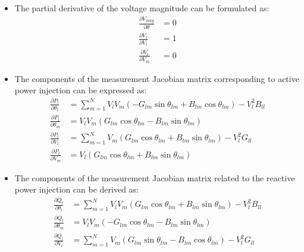 \begin{itemize}
    \item The partial derivative of the voltage magnitude can be formulated as:
        \begin{align} 
    	    \frac{\partial V_{mag}}{\partial \theta} &= 0
    	    \label{eq:V_mag_theta} \\[1pt]
    	    \frac{\partial V_{l}}{\partial V_{l}} &= 1
    	    \label{eq:V_mag_l} \\[1pt]
    	    \frac{\partial V_{l}}{\partial V_{m}} &= 0 
    	    \label{eq:V_mag_m} 
        \end{align}
    \item The components of the measurement Jacobian matrix corresponding to active power injection can be expressed as:
        \begin{align} 
    	    \frac{\partial P_{l}}{\partial \theta_l} &= \sum_{m=1}^{N}V_l V_m \left(-G_{lm}\sin{\theta_{lm}}+B_{lm}\cos{\theta_{lm}}\right)-V_l^2 B_{ll}
    	    \label{eq:P_inj_theta_l} \\[1pt]
    	    \frac{\partial P_{l}}{\partial \theta_m} &= V_l V_m \left(G_{lm}\cos{\theta_{lm}}-B_{lm}\sin{\theta_{lm}}\right)
    	    \label{eq:P_inj_theta_m} \\[1pt]
    	    \frac{\partial P_{l}}{\partial V_l} &= \sum_{m=1}^{N}V_m \left(G_{lm}\cos{\theta_{lm}}+B_{lm}\sin{\theta_{lm}}\right)-V_l^2 G_{ll} \\[1pt]
    	    \label{eq:P_inj_V_l}
            \frac{\partial P_{l}}{\partial V_m} &= V_l \left(G_{lm}\cos\theta_{lm}+B_{lm}\sin\theta_{lm} \right) 
    	    \label{eq:P_inj_theta_m}     	    
        \end{align}    
    \item The components of the measurement Jacobian matrix related to the reactive power injection can be derived as:
        \begin{align} 
    	    \frac{\partial Q_{l}}{\partial \theta_l} &= \sum_{m=1}^{N}V_l V_m \left(G_{lm}\cos{\theta_{lm}}+B_{lm}\sin{\theta_{lm}}\right)-V_l^2 B_{ll}
    	    \label{eq:Q_inj_theta_l} \\[1pt]
    	    \frac{\partial Q_{l}}{\partial \theta_m} &= V_l V_m \left(-G_{lm}\cos{\theta_{lm}}-B_{lm}\sin{\theta_{lm}}\right)
    	    \label{eq:Q_inj_theta_m} \\[1pt]
    	    \frac{\partial Q_{l}}{\partial V_l} &= \sum_{m=1}^{N}V_m \left(G_{lm}\sin{\theta_{lm}}-B_{lm}\cos{\theta_{lm}}\right)-V_l^2 G_{ll} \\[1pt]
    	    \label{eq:Q_inj_V_l}

\end{align}
\end{itemize}
